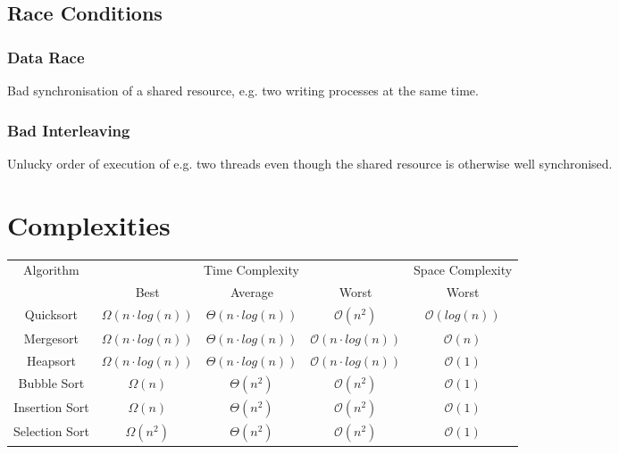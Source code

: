 \documentclass[10pt,landscape,a4paper, table]{extarticle}
\begin{document}
\begin{multicols*}{3}
\subsection{Race Conditions}
\subsubsection{Data Race}
Bad synchronisation of a shared resource, e.g. two writing processes at the same time.
\subsubsection{Bad Interleaving}
Unlucky order of execution of e.g. two threads even though the shared resource is otherwise well synchronised.

\section{Complexities}
\begingroup
\tiny
\renewcommand{\arraystretch}{2} 
\begin{tabular}{|c | c c c | c|}
    \hline
        Algorithm &  \multicolumn{3}{c|}{Time Complexity}   & Space Complexity \\
         & Best & Average & Worst & Worst \\ \hline
        Quicksort & \cellcolor{orange} $\Omega(n\cdot log(n))$ & \cellcolor{orange} $\Theta(n \cdot log(n))$ & \cellcolor{red} $\mathcal{O}(n^2)$ & \cellcolor[HTML]{9acd32} $\mathcal{O}(log(n))$ \\ \hline
        Mergesort & \cellcolor{orange} $\Omega(n \cdot log(n))$ & \cellcolor{orange} $\Theta (n \cdot log(n))$ & \cellcolor{orange} $\mathcal{O}(n \cdot log(n))$ & \cellcolor{yellow} $\mathcal{O}(n)$ \\ \hline
        Heapsort & \cellcolor{orange} $\Omega(n\cdot log(n))$ & \cellcolor{orange} $\Theta(n \cdot log(n))$ & \cellcolor{orange} $\mathcal{O}(n \cdot log(n))$ & \cellcolor{green} $\mathcal{O}(1)$ \\ \hline
        Bubble Sort & \cellcolor{yellow} $\Omega(n)$ & \cellcolor{red} $\Theta(n^2)$ & \cellcolor{red} $\mathcal{O}(n^2)$ & \cellcolor{green} $\mathcal{O}(1)$ \\ \hline
        Insertion Sort & \cellcolor{yellow} $\Omega(n)$ & \cellcolor{red} $\Theta(n^2)$ & \cellcolor{red} $\mathcal{O}(n^2)$ & \cellcolor{green} $\mathcal{O}(1)$ \\ \hline
        Selection Sort & \cellcolor{red}$\Omega(n^2)$ & \cellcolor{red} $\Theta(n^2)$ & \cellcolor{red} $\mathcal{O}(n^2)$ & \cellcolor{green} $\mathcal{O}(1)$ \\ \hline

\end{tabular}
\end{multicols*}
\end{document}
